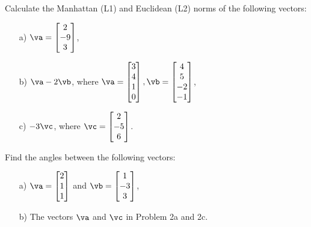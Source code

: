 \bigskip
\begin{problem}[2 point]
    Calculate the Manhattan (L1) and Euclidean (L2) norms of the following vectors:

    \begin{enumerate}
        \item[a) ] $\va= \begin{bmatrix} 2\\-9\\3 \end{bmatrix}$,
        
        \item[b) ] $\va-2\vb$, where $\va= \begin{bmatrix}3\\4\\1\\0\end{bmatrix}, \vb = \begin{bmatrix}4\\5\\-2\\-1\end{bmatrix}$,
        
        \item[c) ] $-3\vc$, where $\vc= \begin{bmatrix}2\\-5\\6\end{bmatrix}$.
    \end{enumerate}

\end{problem}
\bigskip



\begin{problem}[1 point]
    Find the angles between the following vectors:

    \begin{enumerate}
        \item[a) ] $\va= \begin{bmatrix} 2\\1\\1\end{bmatrix}$ and $\vb= \begin{bmatrix} 1\\-3\\3\end{bmatrix}$,
        
        \item[b) ] The vectors $\va$ and $\vc$ in Problem 2a and 2c.

    \end{enumerate}
\end{problem}
\bigskip




